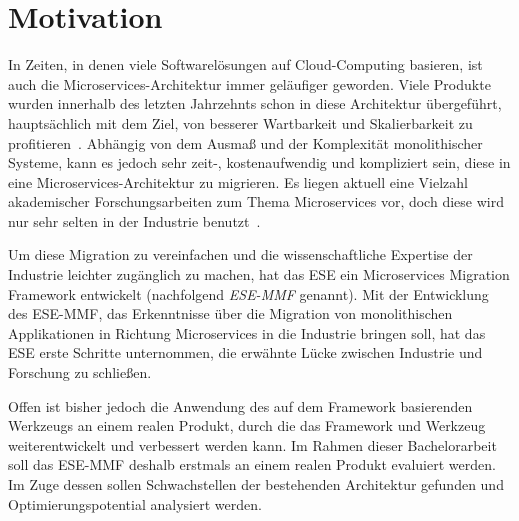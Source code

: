 \chapter{Motivation}

In Zeiten, in denen viele Softwarelösungen auf Cloud-Computing basieren, ist auch die Microservices-Architektur immer geläufiger geworden.
Viele Produkte wurden innerhalb des letzten Jahrzehnts schon in diese Architektur übergeführt, hauptsächlich mit dem Ziel, von besserer Wartbarkeit und Skalierbarkeit zu profitieren~\cite{Fritzsch_2019}.
Abhängig von dem Ausmaß und der Komplexität monolithischer Systeme, kann es jedoch sehr zeit-, kostenaufwendig und kompliziert sein, diese in eine Microservices-Architektur zu migrieren.
Es liegen aktuell eine Vielzahl akademischer Forschungsarbeiten zum Thema Microservices vor, doch diese wird nur sehr selten in der Industrie benutzt~\cite{fritzsch2022architecturecentric}.

Um diese Migration zu vereinfachen und die wissenschaftliche Expertise der Industrie leichter zugänglich zu machen, hat das ESE ein Microservices Migration Framework entwickelt (nachfolgend \emph{ESE-MMF} genannt).
Mit der Entwicklung des ESE-MMF, das Erkenntnisse über die Migration von monolithischen Applikationen in Richtung Microservices in die Industrie bringen soll, hat das ESE erste Schritte unternommen, die erwähnte Lücke zwischen Industrie und Forschung zu schließen.

Offen ist bisher jedoch die Anwendung des auf dem Framework basierenden Werkzeugs an einem realen Produkt, durch die das Framework und Werkzeug weiterentwickelt und verbessert werden kann.
Im Rahmen dieser Bachelorarbeit soll das ESE-MMF deshalb erstmals an einem realen Produkt evaluiert werden.
Im Zuge dessen sollen Schwachstellen der bestehenden Architektur gefunden und Optimierungspotential analysiert werden.
